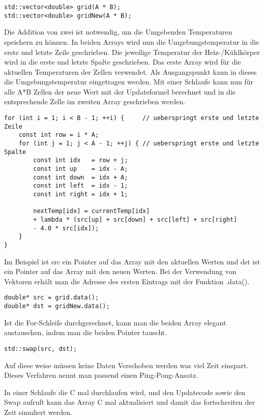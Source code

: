 \begin{lstlisting}
std::vector<double> grid(A * B);
std::vector<double> gridNew(A * B);
\end{lstlisting}
Die Addition von zwei ist notwendig, um die Umgebenden Temperaturen speichern zu können.
In beiden Arrays wird nun die Umgebungstemperatur in die erste und letzte Zeile geschrieben.
Die jeweilige Temperatur der Heiz-/Kühlkörper wird in die erste und letzte Spalte geschrieben.
Das erste Array wird für die aktuellen Temperaturen der Zellen verwendet.
Als Ausgangspunkt kann in dieses die Umgebungstemperatur eingetragen werden.
Mit einer Schlaufe kann nun für alle A*B Zellen der neue Wert mit der Updateformel berechnet und in die entsprechende Zelle im zweiten Array geschrieben werden.
\begin{lstlisting}[caption={Update-Schritt (seriell)},label={parallelisierung:code:updateSeriel}]
for (int i = 1; i < B - 1; ++i) {     // ueberspringt erste und letzte Zeile
	const int row = i * A;
	for (int j = 1; j < A - 1; ++j) { // ueberspringt erste und letzte Spalte
		const int idx   = row + j;
		const int up    = idx - A;
		const int down  = idx + A;
		const int left  = idx - 1;
		const int right = idx + 1;
		
		nextTemp[idx] = currentTemp[idx]
		+ lambda * (src[up] + src[down] + src[left] + src[right]
		- 4.0 * src[idx]);
	}
}
\end{lstlisting}
Im Beispiel ist src ein Pointer auf das Array mit den aktuellen Werten und dst ist ein Pointer auf das Array mit den neuen Werten.
Bei der Verwendung von Vektoren erhält man die Adresse des ersten Eintrags mit der Funktion .data().
\begin{lstlisting}
double* src = grid.data();
double* dst = gridNew.data();
\end{lstlisting}

Ist die For-Schleife durchgerechnet, kann man die beiden Array elegant austauschen, indem man die beiden Pointer tauscht.
\begin{lstlisting}
std::swap(src, dst);
\end{lstlisting}
Auf diese weise müssen keine Daten Verschoben werden was viel Zeit einspart.
Dieses Verfahren nennt man passend einen Ping-Pong-Ansatz.

In einer Schlaufe die C mal durchlaufen wird, und den Updatecode sowie den Swap aufruft kann das Array C mal aktualisiert und damit das fortschreiten der Zeit simuliert werden.

